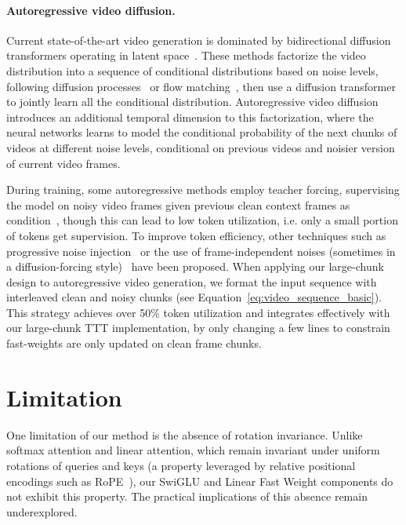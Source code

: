 \documentclass{article}
\begin{document}
\paragraph{Autoregressive video diffusion.}
Current state-of-the-art video generation is dominated by bidirectional diffusion transformers operating in latent space~\cite{videoworldsimulators2024, yang2024cogvideox, polyak2410movie, wang2025wan}. These methods factorize the video distribution into a sequence of conditional distributions based on noise levels, following diffusion processes~\cite{sohl2015deep, song2020score} or flow matching~\cite{lipman2022flow}, then use a diffusion transformer to jointly learn all the conditional distribution. Autoregressive video diffusion~\cite{alonso2024diffusion, jin2024pyramidal, valevski2024diffusion, ruhe2024rolling, yin2024slow, song2025history} introduces an additional temporal dimension to this factorization, where the neural networks learns to model the conditional probability of the next chunks of videos at different noise levels, conditional on previous videos and noisier  version of current video frames.  

During training, some autoregressive methods employ teacher forcing, supervising the model on noisy video frames given previous  clean context frames as condition~\cite{alonso2024diffusion,jin2024pyramidal,valevski2024diffusion}, though this can lead to low token utilization, i.e. only a small portion of tokens get supervision. To improve token efficiency, other techniques such as progressive noise injection~\cite{ruhe2024rolling} or the use of frame-independent noises (sometimes in a diffusion-forcing style)~\cite{yin2024slow, chen2024diffusion, magi1} have been proposed. When applying our large-chunk design to autoregressive video generation, we format the input sequence with interleaved clean and noisy chunks (see Equation~\ref{eq:video_sequence_basic}). This strategy achieves over 50\% token utilization and integrates effectively with our large-chunk TTT implementation, by only changing a few lines to constrain fast-weights are only updated on clean frame chunks.

\section{Limitation}
One limitation of our method is the absence of rotation invariance. Unlike softmax attention and linear attention, which remain invariant under uniform rotations of queries and keys (a property leveraged by relative positional encodings such as RoPE~\cite{su2023roformer}), our SwiGLU and Linear Fast Weight components do not exhibit this property. The practical implications of this absence remain underexplored.
\end{document}
